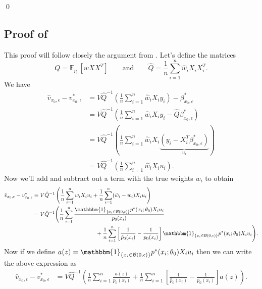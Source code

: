 \documentclass[11pt]{article}
\begin{document}
\qed{}

\subsection{Proof of } \label{sec: proof of velocity decomp}
This proof will follow closely the argument from \citet{Newey_Ruud_2005}. Let's define the matrices
\begin{equation}
    Q = \mathbb{E}_{p_0}\left[wXX^T\right] \qquad \text{and} \qquad \hat{Q} = \frac{1}{n}\sum_{i = 1}^n\hat{w}_iX_iX_i^T.
\end{equation}
We have
\begin{align}
    \hat{v}_{x_0, \epsilon} - v^*_{x_0, \epsilon} &= V\hat{Q}^{-1}\left(\frac{1}{n}\sum_{i = 1}^n\hat{w}_iX_iy_i\right) - \beta^*_{x_0, \epsilon} \\
    &= V\hat{Q}^{-1}\left(\frac{1}{n}\sum_{i = 1}^n\hat{w}_iX_iy_i - \hat{Q}\beta^*_{x_0, \epsilon}\right) \\
    &= V\hat{Q}^{-1}\left(\frac{1}{n}\sum_{i = 1}^n\hat{w}_iX_i\underbrace{\left(y_i - X_i^T\beta^*_{x_0, \epsilon}\right)}_{u_i}\right) \\
    &= V\hat{Q}^{-1}\left(\frac{1}{n}\sum_{i = 1}^n\hat{w}_iX_iu_i\right).
\end{align}
Now we'll add and subtract out a term with the true weights $w_i$ to obtain
\begin{align}
    \hat{v}_{x_0, \epsilon} - v^*_{x_0, \epsilon} &= V\hat{Q}^{-1}\left(\frac{1}{n}\sum_{i = 1}^nw_iX_iu_i + \frac{1}{n}\sum_{i = 1}^n(\hat{w}_i - w_i)X_iu_i\right) \\
    &= V\hat{Q}^{-1}\Bigg(\frac{1}{n}\sum_{i = 1}^n\frac{\mathbbm{1}_{\{x_i \in \mathcal{B}(0, \epsilon)\}}p^*(x_i;\theta_0)X_iu_i}{p_0(x_i)} \\
    &\hspace{40mm}+ \frac{1}{n}\sum_{i = 1}^n\left[\frac{1}{\hat{p}_0(x_i)} - \frac{1}{p_0(x_i)}\right]\mathbbm{1}_{\{x_i \in \mathcal{B}(0, \epsilon)\}}p^*(x_i;\theta_0)X_iu_i\Bigg).
\end{align}
Now if we define $a(z) = \mathbbm{1}_{\{x_i \in \mathcal{B}(0, \epsilon)\}}p^*(x_i;\theta_0)X_iu_i$ then we can write the above expression as
\begin{align}
    \hat{v}_{x_0, \epsilon} - v^*_{x_0, \epsilon} &= V\hat{Q}^{-1}\left(\frac{1}{n}\sum_{i = 1}^n\frac{a(z)}{p_0(x_i)} + \frac{1}{n}\sum_{i = 1}^n\left[\frac{1}{\hat{p}_0(x_i)} - \frac{1}{p_0(x_i)}\right]a(z)\right).
\end{align}
\end{document}
